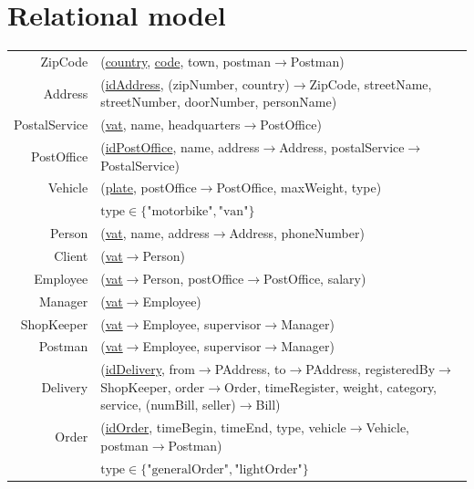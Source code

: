 \documentclass{report}[a4paper]
\theoremstyle{remark}
\begin{document}
\chapter{Relational model}
\begin{center} \setlength{\tabcolsep}{1pt}
    \begin{tabular}{r p{144mm}}
        ZipCode         & (\uline{country}, \uline{code}, town, postman$\rightarrow$Postman)  \\
        Address         & (\uline{idAddress}, (zipNumber, country)$\rightarrow$ZipCode, streetName, streetNumber, doorNumber, personName) \\
        PostalService   & (\uline{vat}, name, headquarters$\rightarrow$PostOffice)              \\
        PostOffice      & (\uline{idPostOffice}, name, address$\rightarrow$Address, postalService$\rightarrow$PostalService) \\
        Vehicle         & (\uline{plate}, postOffice$\rightarrow$PostOffice, maxWeight, type) \\
                        & $\text{type} \in \{\text{"motorbike"}, \text{"van"}\}$\\
        Person          & (\uline{vat}, name, address$\rightarrow$Address, phoneNumber)         \\
        Client          & (\uline{vat}$\rightarrow$Person)                                      \\
        Employee        & (\uline{vat}$\rightarrow$Person, postOffice$\rightarrow$PostOffice, salary) \\
        Manager         & (\uline{vat}$\rightarrow$Employee)                                    \\
        ShopKeeper      & (\uline{vat}$\rightarrow$Employee, supervisor$\rightarrow$Manager)    \\
        Postman         & (\uline{vat}$\rightarrow$Employee, supervisor$\rightarrow$Manager)    \\
        Delivery        & (\uline{idDelivery}, from$\rightarrow$PAddress, to$\rightarrow$PAddress, registeredBy$\rightarrow$ShopKeeper, order$\rightarrow$Order, timeRegister, weight, category, service, (numBill, seller)$\rightarrow$Bill) \\
        Order           & (\uline{idOrder}, timeBegin, timeEnd, type, vehicle$\rightarrow$Vehicle, postman$\rightarrow$Postman) \\
                        & $\text{type} \in \{\text{"generalOrder"}, \text{"lightOrder"}\}$\\

\end{tabular}
\end{center}
\end{document}
